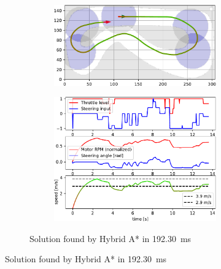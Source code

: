\begin{figure}[!tbp]%
	\centering
	
	\begin{subfigure}[t]{\textwidth}
		\begin{subfigure}[c]{0.49\textwidth}
			\includegraphics[width=\textwidth]{../img/experiments/porto_hybrid_astar_trajectory}
		\end{subfigure}
		\hfill
		\begin{subfigure}[c]{0.49\textwidth}
			\includegraphics[width=\textwidth]{../img/experiments/porto_hybrid_astar_actuators}
		\end{subfigure}
		\caption{Solution found by Hybrid A* in \SI{192.30}{\milli\second}}
		\label{fig:solution_porto-hybrid_astar}	
	\end{subfigure}
	
	\vspace{0.5cm}
	

\end{figure}
